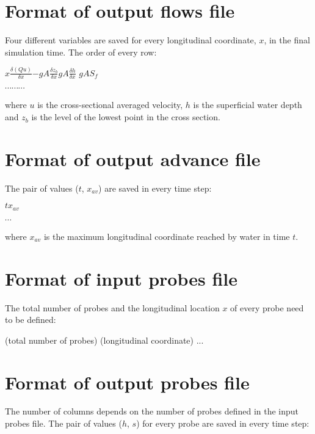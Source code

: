 \documentclass[a4paper,12pt]{report}
\begin{document}
\section{Format of output flows file}
Four different variables are saved for every longitudinal coordinate, $x$, in the final simulation time. 
The order of every row:

\hspace{1.8cm}$x$\hspace{0.9cm}$\frac{\delta(Qu)}{\delta x}$\hspace{0.9cm}$-gA\frac{\delta z_b}{\delta x}$\hspace{0.9cm}$gA\frac{\delta h}{\delta x}$
\hspace{0.9cm}$gAS_f$ 

\hspace{3.8cm} $\cdots \cdots \cdots$

\noindent where $u$ is the cross-sectional averaged velocity, $h$ is the superficial water depth and $z_b$ is the 
level of the lowest point in the cross section.

\section{Format of output advance file}

The pair of values ($t$, $x_{av}$) are saved in every time step:

\hspace{1.8cm}$t$\hspace{0.9cm}$x_{av}$

\hspace{1.8cm} $\cdots$

\noindent where $x_{av}$ is the maximum longitudinal coordinate reached by water in time $t$.

\section{Format of input probes file}
 
The total number of probes and the longitudinal location $x$ of every probe need to be defined:

\begin{verbatimtab}
	(total number of probes)
	(longitudinal coordinate)
	...
\end{verbatimtab}

\section{Format of output probes file}
The number of columns depends on the number of probes defined in the input probes file.
The pair of values ($h$, $s$) for every probe are saved in every time step:
\end{document}
